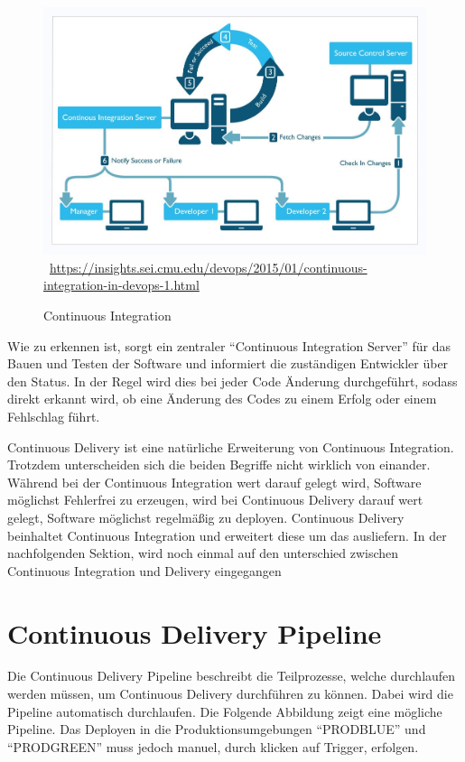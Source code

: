 \begin{figure}[htb]
    \centering 
    \includegraphics[width=\linewidth]{content/images/continuous_integration}\
    \quelle\url{https://insights.sei.cmu.edu/devops/2015/01/continuous-integration-in-devops-1.html}
    \caption[Continuous Integration]{Continuous Integration\\}
    \label{fig:ContinuousIntegration}  
\end{figure}\noindent 
Wie zu erkennen ist, sorgt ein zentraler "`Continuous Integration Server"' für das Bauen und Testen der Software und informiert die zuständigen Entwickler über den Status. In der Regel wird dies bei jeder Code Änderung durchgeführt, sodass direkt erkannt wird, ob eine Änderung des Codes zu einem Erfolg oder einem Fehlschlag führt.

Continuous Delivery ist eine natürliche Erweiterung von Continuous Integration. Trotzdem unterscheiden sich die beiden Begriffe nicht wirklich von einander. Während bei der Continuous Integration wert darauf gelegt wird, Software möglichst Fehlerfrei zu erzeugen, wird bei Continuous Delivery  darauf wert gelegt, Software möglichst regelmäßig zu deployen. Continuous Delivery beinhaltet Continuous Integration und erweitert diese um das ausliefern. In der nachfolgenden Sektion, wird noch einmal auf den unterschied zwischen Continuous Integration und Delivery eingegangen

\section{Continuous Delivery Pipeline}
\label{subsec:Continuous Delivery Pipeline}
Die Continuous Delivery Pipeline beschreibt die Teilprozesse, welche durchlaufen werden müssen, um Continuous Delivery durchführen zu können. Dabei wird die Pipeline automatisch durchlaufen. Die Folgende Abbildung zeigt eine mögliche Pipeline. Das Deployen in die Produktionsumgebungen "`PRODBLUE"' und "`PRODGREEN"' muss jedoch manuel, durch klicken auf Trigger, erfolgen.

